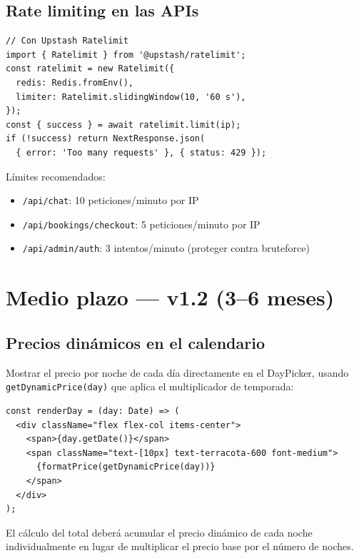 \documentclass[12pt,a4paper,twoside,openright]{report}
\begin{document}
\subsection{Rate limiting en las APIs}

\begin{lstlisting}[style=tsStyle]
// Con Upstash Ratelimit
import { Ratelimit } from '@upstash/ratelimit';
const ratelimit = new Ratelimit({
  redis: Redis.fromEnv(),
  limiter: Ratelimit.slidingWindow(10, '60 s'),
});
const { success } = await ratelimit.limit(ip);
if (!success) return NextResponse.json(
  { error: 'Too many requests' }, { status: 429 });
\end{lstlisting}

Límites recomendados:
\begin{itemize}
  \item \texttt{/api/chat}: 10 peticiones/minuto por IP
  \item \texttt{/api/bookings/checkout}: 5 peticiones/minuto por IP
  \item \texttt{/api/admin/auth}: 3 intentos/minuto (proteger contra bruteforce)
\end{itemize}

\section{Medio plazo — v1.2 (3–6 meses)}

\subsection{Precios dinámicos en el calendario}

Mostrar el precio por noche de cada día directamente en el DayPicker, usando
\texttt{getDynamicPrice(day)} que aplica el multiplicador de temporada:

\begin{lstlisting}[style=tsStyle]
const renderDay = (day: Date) => (
  <div className="flex flex-col items-center">
    <span>{day.getDate()}</span>
    <span className="text-[10px] text-terracota-600 font-medium">
      {formatPrice(getDynamicPrice(day))}
    </span>
  </div>
);
\end{lstlisting}

El cálculo del total deberá acumular el precio dinámico de cada noche individualmente
en lugar de multiplicar el precio base por el número de noches.
\end{document}
